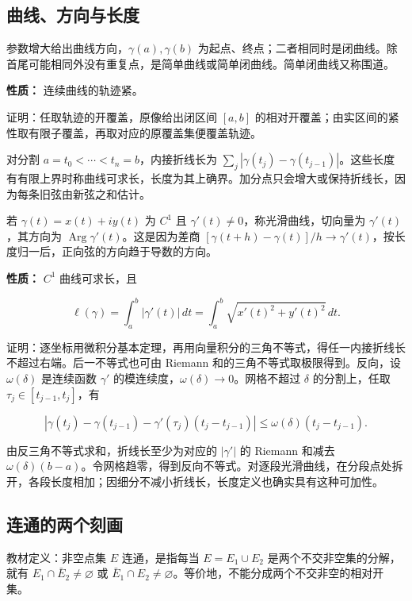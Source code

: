 \documentclass[11pt,a4paper]{article}
\begin{document}
\subsection{曲线、方向与长度}\label{ux66f2ux7ebfux65b9ux5411ux4e0eux957fux5ea6}

参数增大给出曲线方向，\(\gamma(a),\gamma(b)\)
为起点、终点；二者相同时是闭曲线。除首尾可能相同外没有重复点，是简单曲线或简单闭曲线。简单闭曲线又称围道。

\textbf{性质：} 连续曲线的轨迹紧。

证明：任取轨迹的开覆盖，原像给出闭区间 \([a,b]\)
的相对开覆盖；由实区间的紧性取有限子覆盖，再取对应的原覆盖集便覆盖轨迹。

对分割 \(a=t_0<\cdots<t_n=b\)，内接折线长为
\(\sum_j|\gamma(t_j)-\gamma(t_{j-1})|\)。这些长度有有限上界时称曲线可求长，长度为其上确界。加分点只会增大或保持折线长，因为每条旧弦由新弦之和估计。

若 \(\gamma(t)=x(t)+iy(t)\) 为 \(C^1\) 且
\(\gamma'(t)\ne0\)，称光滑曲线，切向量为 \(\gamma'(t)\)，其方向为
\(\operatorname{Arg}\gamma'(t)\)。这是因为差商
\([\gamma(t+h)-\gamma(t)]/h\to\gamma'(t)\)，按长度归一后，正向弦的方向趋于导数的方向。

\textbf{性质：} \(C^1\) 曲线可求长，且

\[
\ell(\gamma)=\int_a^b|\gamma'(t)|\,dt
=\int_a^b\sqrt{x'(t)^2+y'(t)^2}\,dt.
\]

证明：逐坐标用微积分基本定理，再用向量积分的三角不等式，得任一内接折线长不超过右端。后一不等式也可由
Riemann 和的三角不等式取极限得到。反向，设 \(\omega(\delta)\) 是连续函数
\(\gamma'\) 的模连续度，\(\omega(\delta)\to0\)。网格不超过 \(\delta\)
的分割上，任取 \(\tau_j\in[t_{j-1},t_j]\)，有

\[
\left|\gamma(t_j)-\gamma(t_{j-1})-\gamma'(\tau_j)(t_j-t_{j-1})\right|
\le\omega(\delta)(t_j-t_{j-1}).
\]

由反三角不等式求和，折线长至少为对应的 \(|\gamma'|\) 的 Riemann 和减去
\(\omega(\delta)(b-a)\)。令网格趋零，得到反向不等式。对逐段光滑曲线，在分段点处拆开，各段长度相加；因细分不减小折线长，长度定义也确实具有这种可加性。

\subsection{连通的两个刻画}\label{ux8fdeux901aux7684ux4e24ux4e2aux523bux753b}

教材定义：非空点集 \(E\) 连通，是指每当 \(E=E_1\cup E_2\)
是两个不交非空集的分解，就有 \(E_1\cap\bar E_2\ne\varnothing\) 或
\(\bar E_1\cap E_2\ne\varnothing\)。等价地，不能分成两个不交非空的相对开集。
\end{document}
